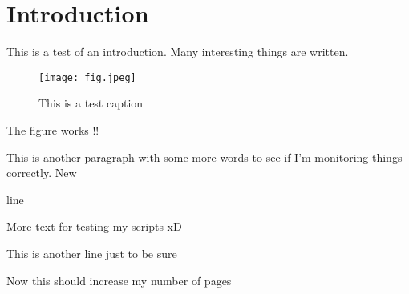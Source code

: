 \chapter{Introduction}
\label{ch:intro}

This is a test of an introduction. Many interesting things are written.

\begin{figure}[h]
	\centering
	\texttt{[image: fig.jpeg]}
	\caption{This is a test caption}
	\label{fig:testfig}
\end{figure}

The figure works !! \cite{feynman2018space}

This is another paragraph with some more words to see if I'm monitoring things correctly. New

line

More text for testing my scripts xD

This is another line just to be sure

\pagebreak

Now this should increase my number of pages
